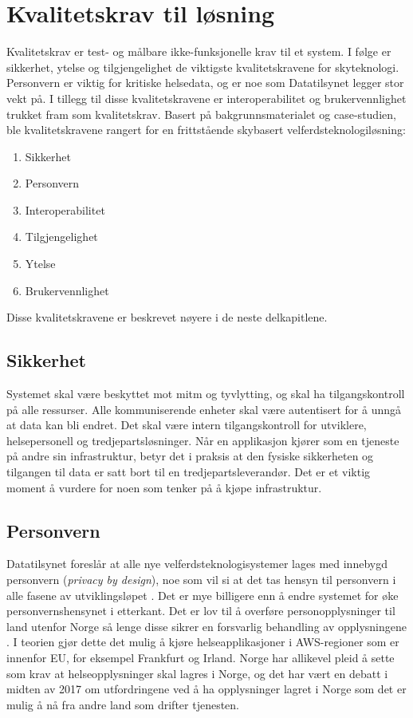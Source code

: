 \chapter{Kvalitetskrav til løsning}
\label{ch:requirements}

Kvalitetskrav er test- og målbare ikke-funksjonelle krav til et system.
I følge \citet{softarch} er sikkerhet, ytelse og tilgjengelighet de viktigste kvalitetskravene for skyteknologi.
Personvern er viktig for kritiske helsedata, og er noe som Datatilsynet legger stor vekt på. I tillegg til disse kvalitetskravene
er interoperabilitet og brukervennlighet trukket fram som kvalitetskrav. Basert på bakgrunnsmaterialet og case-studien,
ble kvalitetskravene rangert for en frittstående skybasert velferdsteknologiløsning:

\begin{enumerate}
    \item Sikkerhet
    \item Personvern
    \item Interoperabilitet
    \item Tilgjengelighet
    \item Ytelse
    \item Brukervennlighet
\end{enumerate}

Disse kvalitetskravene er beskrevet nøyere i de neste delkapitlene.

\section{Sikkerhet}
Systemet skal være beskyttet mot \gls{mitm} og tyvlytting, og skal ha tilgangskontroll på alle ressurser.
Alle kommuniserende enheter skal være autentisert for å unngå at data kan bli endret.
Det skal være intern tilgangskontroll for utviklere, helsepersonell og tredjepartsløsninger. Når en
applikasjon kjører som en tjeneste på andre sin infrastruktur, betyr det i praksis at den fysiske
sikkerheten og tilgangen til data er satt bort til en tredjepartsleverandør. Det er et viktig
moment å vurdere for noen som tenker på å kjøpe infrastruktur.

\section{Personvern}
Datatilsynet foreslår at alle nye velferdsteknologisystemer lages med innebygd personvern (\textit{privacy by design}),
noe som vil si at det tas hensyn til personvern i alle fasene av utviklingsløpet \citep{datatilsynet_privacy}. Det er mye billigere
enn å endre systemet for øke personvernshensynet i etterkant. Det er lov til
å overføre personopplysninger til land utenfor Norge så lenge disse sikrer en forsvarlig
behandling av opplysningene \citep{datatilsynet_utlandet}. I teorien gjør dette det mulig å kjøre helseapplikasjoner i AWS-regioner
som er innenfor EU, for eksempel Frankfurt og Irland. Norge har allikevel pleid å sette
som krav at helseopplysninger skal lagres i Norge, og det har vært en debatt i midten
av 2017 om utfordringene ved å ha opplysninger lagret i Norge som det er mulig å nå fra
andre land som drifter tjenesten.

